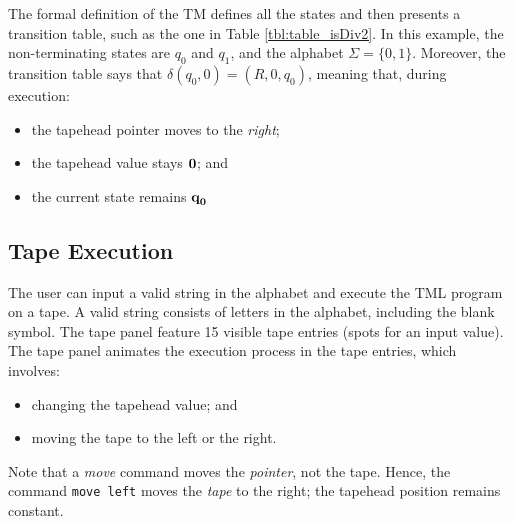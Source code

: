 The formal definition of the TM defines all the states and then presents a transition table, such as the one in Table \ref{tbl:table_isDiv2}. In this example, the non-terminating states are $q_0$ and $q_1$, and the alphabet $\Sigma = \{0, 1\}$. Moreover, the transition table says that $\delta(q_0, 0) = (R, 0, q_0)$, meaning that, during execution:
\begin{itemize}
    \item the tapehead pointer moves to the \emph{right};
    \item the tapehead value stays $\emph{0}$; and 
    \item the current state remains $\emph{q}_\emph{0}$
\end{itemize}

\subsection{Tape Execution}
The user can input a valid string in the alphabet and execute the TML program on a tape. A valid string consists of letters in the alphabet, including the blank symbol. The tape panel feature 15 visible tape entries (spots for an input value). The tape panel animates the execution process in the tape entries, which involves:
\begin{itemize}
    \item changing the tapehead value; and
    \item moving the tape to the left or the right.
\end{itemize}
Note that a \textit{move} command moves the \textit{pointer}, not the tape. Hence, the command \texttt{move left} moves the \textit{tape} to the right; the tapehead position remains constant.

